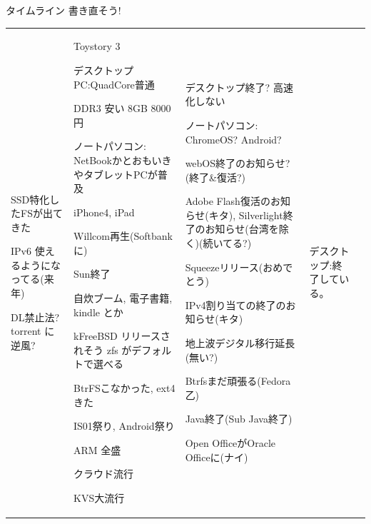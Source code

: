 \begin{frame}{タイムライン 書き直そう!}
{\begin{tabular}[t]{|p{8.5em}|p{12em}|p{8em}|p{6em}|p{8em}|}
SSD特化したFSが出てきた

IPv6 使えるようになってる(来年)

DL禁止法? torrent に逆風?

&

Toystory 3

デスクトップPC:QuadCore普通

DDR3 安い 8GB 8000円

ノートパソコン:
NetBookかとおもいきやタブレットPCが普及

iPhone4, iPad

Willcom再生(Softbankに)

Sun終了




自炊ブーム, 電子書籍, kindle とか

kFreeBSD リリースされそう
zfs がデフォルトで選べる

BtrFSこなかった, ext4 きた

IS01祭り, Android祭り

ARM 全盛

クラウド流行

KVS大流行



&

デスクトップ終了?
高速化しない

ノートパソコン:
ChromeOS?
Android?

webOS終了のお知らせ?(終了\&復活?)

Adobe Flash復活のお知らせ(キタ), Silverlight終了のお知らせ(台湾を除く)(続いてる?)

Squeezeリリース(おめでとう)

IPv4割り当ての終了のお知らせ(キタ)

地上波デジタル移行延長(無い?)

Btrfsまだ頑張る(Fedora乙)

Java終了(Sub Java終了)

Open OfficeがOracle Officeに(ナイ)

&

デスクトップ:終了している。


\end{tabular}}
\end{frame}
